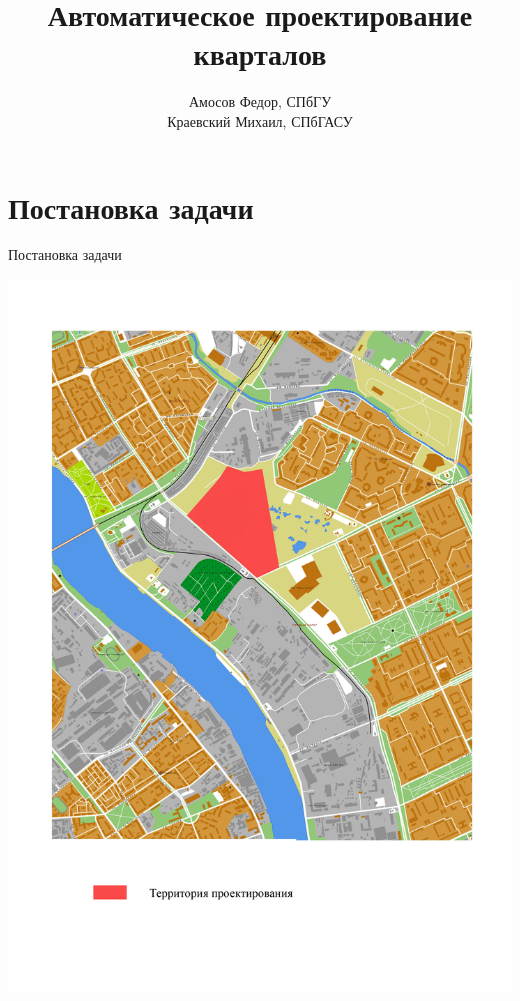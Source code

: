 \documentclass[14pt, fleqn, xcolor={dvipsnames, table}]{beamer}
\title{Автоматическое проектирование кварталов}
\author[]{
    \small{
        Амосов Федор, СПбГУ\\
        Краевский Михаил, СПбГАСУ
    }
}
\date{}
\begin{document}
    \begin{frame}
        \maketitle
        \small
    \end{frame}

    \section{Постановка задачи}  
    
        \begin{frame}{Постановка задачи}
            \begin{center}
                \includegraphics[scale=0.25]{top-plan.jpg} 

\end{center}
\end{frame}
\end{document}
